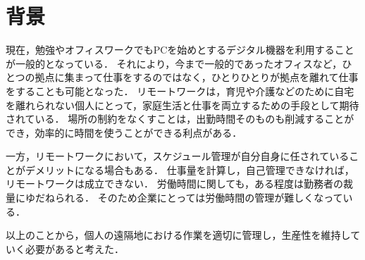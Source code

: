\section{背景}
現在，勉強やオフィスワークでもPCを始めとするデジタル機器を利用することが一般的となっている．
それにより，今まで一般的であったオフィスなど，ひとつの拠点に集まって仕事をするのではなく，ひとりひとりが拠点を離れて仕事をすることも可能となった．
リモートワークは，育児や介護などのために自宅を離れられない個人にとって，家庭生活と仕事を両立するための手段として期待されている．
場所の制約をなくすことは，出勤時間そのものも削減することができ，効率的に時間を使うことができる利点がある\cite{tele2017}．

一方，リモートワークにおいて，スケジュール管理が自分自身に任されていることがデメリットになる場合もある．
仕事量を計算し，自己管理できなければ，リモートワークは成立できない．
労働時間に関しても，ある程度は勤務者の裁量にゆだねられる．
そのため企業にとっては労働時間の管理が難しくなっている\cite{Adachi2010}．

以上のことから，個人の遠隔地における作業を適切に管理し，生産性を維持していく必要があると考えた．
